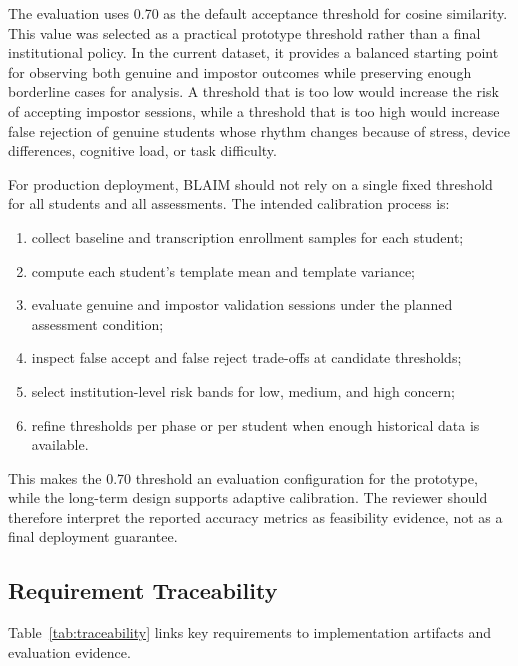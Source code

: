 The evaluation uses 0.70 as the default acceptance threshold for cosine similarity. This value was selected as a practical prototype threshold rather than a final institutional policy. In the current dataset, it provides a balanced starting point for observing both genuine and impostor outcomes while preserving enough borderline cases for analysis. A threshold that is too low would increase the risk of accepting impostor sessions, while a threshold that is too high would increase false rejection of genuine students whose rhythm changes because of stress, device differences, cognitive load, or task difficulty.

For production deployment, BLAIM should not rely on a single fixed threshold for all students and all assessments. The intended calibration process is:

\begin{enumerate}
  \item collect baseline and transcription enrollment samples for each student;
  \item compute each student's template mean and template variance;
  \item evaluate genuine and impostor validation sessions under the planned assessment condition;
  \item inspect false accept and false reject trade-offs at candidate thresholds;
  \item select institution-level risk bands for low, medium, and high concern;
  \item refine thresholds per phase or per student when enough historical data is available.
\end{enumerate}

This makes the 0.70 threshold an evaluation configuration for the prototype, while the long-term design supports adaptive calibration. The reviewer should therefore interpret the reported accuracy metrics as feasibility evidence, not as a final deployment guarantee.

\subsection{Requirement Traceability}
\label{subsec:requirement-traceability}

Table~\ref{tab:traceability} links key requirements to implementation artifacts and evaluation evidence.

